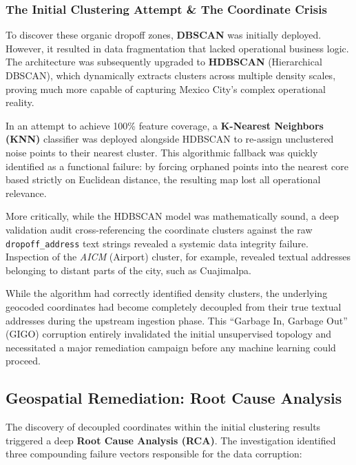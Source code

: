 \subsubsection{The Initial Clustering Attempt \& The Coordinate Crisis}
To discover these organic dropoff zones, \textbf{DBSCAN} was initially deployed. However, it resulted in data fragmentation that lacked operational business logic. The architecture was subsequently upgraded to \textbf{HDBSCAN} (Hierarchical DBSCAN), which dynamically extracts clusters across multiple density scales, proving much more capable of capturing Mexico City's complex operational reality. 

In an attempt to achieve 100\% feature coverage, a \textbf{K-Nearest Neighbors (KNN)} classifier was deployed alongside HDBSCAN to re-assign unclustered noise points to their nearest cluster. This algorithmic fallback was quickly identified as a functional failure: by forcing orphaned points into the nearest core based strictly on Euclidean distance, the resulting map lost all operational relevance. 

More critically, while the HDBSCAN model was mathematically sound, a deep validation audit cross-referencing the coordinate clusters against the raw \texttt{dropoff\_address} text strings revealed a systemic data integrity failure. Inspection of the \textit{AICM} (Airport) cluster, for example, revealed textual addresses belonging to distant parts of the city, such as Cuajimalpa. 

While the algorithm had correctly identified density clusters, the underlying geocoded coordinates had become completely decoupled from their true textual addresses during the upstream ingestion phase. This ``Garbage In, Garbage Out'' (GIGO) corruption entirely invalidated the initial unsupervised topology and necessitated a major remediation campaign before any machine learning could proceed.


\subsection{Geospatial Remediation: Root Cause Analysis}
The discovery of decoupled coordinates within the initial clustering results triggered a deep \textbf{Root Cause Analysis (RCA)}. The investigation identified three compounding failure vectors responsible for the data corruption:

